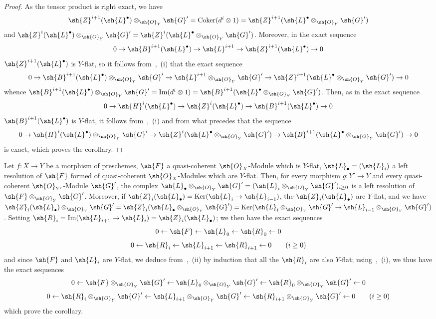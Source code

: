 \begin{proof}
As the tensor product is right exact, we have
\[
  \sh{Z}^{i+1}(\sh{L}^\bullet)\otimes_{\sh{O}_Y}\sh{G}' = \operatorname{Coker}(d^i\otimes 1) = \sh{Z}^{i+1}(\sh{L}^\bullet\otimes_{\sh{O}_Y}\sh{G}')
\]
and $\sh{Z}^{i}(\sh{L}^\bullet)\otimes_{\sh{O}_Y}\sh{G}' = \sh{Z}^{i}(\sh{L}^\bullet\otimes_{\sh{O}_Y}\sh{G}')$.
Moreover, in the exact sequence
\[
  0\to\sh{B}^{i+1}(\sh{L}^\bullet)\to\sh{L}^{i+1}\to\sh{Z}^{i+1}(\sh{L}^\bullet)\to 0
\]
$\sh{Z}^{i+1}(\sh{L}^\bullet)$ is $Y$-flat, so it follows from~,~(i) that the exact sequence
\[
  0\to\sh{B}^{i+1}(\sh{L}^\bullet)\otimes_{\sh{O}_Y}\sh{G}'\to\sh{L}^{i+1}\otimes_{\sh{O}_Y}\sh{G}'\to\sh{Z}^{i+1}(\sh{L}^\bullet\otimes_{\sh{O}_Y}\sh{G}')\to 0
\]
whence $\sh{B}^{i+1}(\sh{L}^\bullet)\otimes_{\sh{O}_Y}\sh{G}'=\operatorname{Im}(d^i\otimes 1)=\sh{B}^{i+1}(\sh{L}^\bullet\otimes_{\sh{O}_Y}\sh{G}')$.
Then, as in the exact sequence
\[
  0\to\sh{H}^i(\sh{L}^\bullet)\to\sh{Z}^i(\sh{L}^\bullet)\to\sh{B}^{i+1}(\sh{L}^\bullet)\to 0
\]
$\sh{B}^{i+1}(\sh{L}^\bullet)$ is $Y$-flat, it follows from~,~(i) and from what precedes that the sequence
\[
  0\to\sh{H}^i(\sh{L}^\bullet)\otimes_{\sh{O}_Y}\sh{G}'\to\sh{Z}^i(\sh{L}^\bullet\otimes_{\sh{O}_Y}\sh{G}')\to\sh{B}^{i+1}(\sh{L}^\bullet\otimes_{\sh{O}_Y}\sh{G}')\to 0
\]
is exact, which proves the corollary.
\end{proof}

\begin{corollary}[2.1.10]
\label{IV.2.1.10}
Let $f:X\to Y$ be a morphism of preschemes, $\sh{F}$ a quasi-coherent $\sh{O}_X$-Module which is $Y$-flat, $\sh{L}_\bullet=(\sh{L}_i)$ a left resolution of $\sh{F}$ formed of quasi-coherent $\sh{O}_X$-Modules which are $Y$-flat.
Then, for every morphism $g:Y'\to Y$ and every quasi-coherent $\sh{O}_{Y'}$-Module $\sh{G}'$, the complex $\sh{L}_\bullet\otimes_{\sh{O}_Y}\sh{G}'=(\sh{L}_i\otimes_{\sh{O}_Y}\sh{G}')_{i\geq 0}$ is a left resolution of $\sh{F}\otimes_{\sh{O}_Y}\sh{G}'$.
Moreover, if $\sh{Z}_i(\sh{L}_\bullet)=\operatorname{Ker}(\sh{L}_i\to\sh{L}_{i-1})$, the $\sh{Z}_i(\sh{L}_\bullet)$ are $Y$-flat, and we have $\sh{Z}_i(\sh{L}_\bullet)\otimes_{\sh{O}_Y}\sh{G}'=\sh{Z}_i(\sh{L}_\bullet\otimes_{\sh{O}_Y}\sh{G}')=\operatorname{Ker}(\sh{L}_i\otimes_{\sh{O}_Y}\sh{G}'\to\sh{L}_{i-1}\otimes_{\sh{O}_Y}\sh{G}')$.
Setting $\sh{R}_i=\operatorname{Im}(\sh{L}_{i+1}\to\sh{L}_i)=\sh{Z}_i(\sh{L}_\bullet)$; we then have the exact sequences
\[
  0\leftarrow\sh{F}\leftarrow\sh{L}_0\leftarrow\sh{R}_0\leftarrow 0
\]
\[
  0\leftarrow\sh{R}_i\leftarrow\sh{L}_{i+1}\leftarrow\sh{R}_{i+1}\leftarrow 0 \qquad (i\geq 0)
\]
and since $\sh{F}$ and $\sh{L}_i$ are $Y$-flat, we deduce from~,~(ii) by induction that all the $\sh{R}_i$ are also $Y$-flat; using~,~(i), we thus have the exact sequences
\[
  0\leftarrow\sh{F}\otimes_{\sh{O}_Y}\sh{G}'\leftarrow\sh{L}_0\otimes_{\sh{O}_Y}\sh{G}'\leftarrow\sh{R}_0\otimes_{\sh{O}_Y}\sh{G}'\leftarrow 0
\]
\[
  0\leftarrow\sh{R}_i\otimes_{\sh{O}_Y}\sh{G}'\leftarrow\sh{L}_{i+1}\otimes_{\sh{O}_Y}\sh{G}'\leftarrow\sh{R}_{i+1}\otimes_{\sh{O}_Y}\sh{G}'\leftarrow 0 \qquad (i\geq 0)
\]
which prove the corollary.
\end{corollary}

